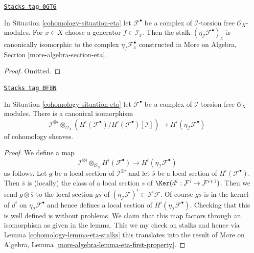 \begin{lemma}
\label{cohomology-lemma-eta-stalks}
\href{https://stacks.math.columbia.edu/tag/0GT6}{\texttt{Stacks tag 0GT6}}

In Situation \ref{cohomology-situation-eta}
let $\mathcal{F}^\bullet$ be a complex of $\mathcal{I}$-torsion free
$\mathcal{O}_X$-modules.
For $x \in X$ choose a generator $f \in \mathcal{I}_x$. Then
the stalk $(\eta_\mathcal{I}\mathcal{F}^\bullet)_x$ is canonically
isomorphic to the complex $\eta_f\mathcal{F}^\bullet_x$ constructed
in More on Algebra, Section \ref{more-algebra-section-eta}.
\end{lemma}

\begin{proof}
Omitted.
\end{proof}

\begin{lemma}
\label{cohomology-lemma-eta-first-property}
\href{https://stacks.math.columbia.edu/tag/0F8N}{\texttt{Stacks tag 0F8N}}

In Situation \ref{cohomology-situation-eta}
let $\mathcal{F}^\bullet$ be a complex of $\mathcal{I}$-torsion free
$\mathcal{O}_X$-modules. There is a canonical isomorphism
$$
\mathcal{I}^{\otimes i} \otimes_{\mathcal{O}_X}
\left(
H^i(\mathcal{F}^\bullet)/H^i(\mathcal{F}^\bullet)[\mathcal{I}]
\right)
\longrightarrow H^i(\eta_\mathcal{I}\mathcal{F}^\bullet)
$$
of cohomology sheaves.
\end{lemma}

\begin{proof}

We define a map
$$
\mathcal{I}^{\otimes i} \otimes_{\mathcal{O}_X} H^i(\mathcal{F}^\bullet)
\longrightarrow
H^i(\eta_\mathcal{I}\mathcal{F}^\bullet)
$$
as follows. Let $g$ be a local section of $\mathcal{I}^{\otimes i}$
and let $\overline{s}$ be a local section of $H^i(\mathcal{F}^\bullet)$.
Then $\overline{s}$ is (locally) the class of a local section $s$ of
$\Ker(d^i : \mathcal{F}^i \to \mathcal{F}^{i + 1})$.
Then we send $g \otimes \overline{s}$ to the local section
$gs$ of $(\eta_\mathcal{I}\mathcal{F})^i \subset \mathcal{I}^i\mathcal{F}$.
Of course $gs$ is in the kernel of $d^i$ on
$\eta_\mathcal{I}\mathcal{F}^\bullet$ and hence defines a local
section of $H^i(\eta_\mathcal{I}\mathcal{F}^\bullet)$.
Checking that this is well defined is without problems.
We claim that this map factors through an isomorphism
as given in the lemma. This we my check on stalks and hence
via Lemma \ref{cohomology-lemma-eta-stalks} this translates into the result of
More on Algebra, Lemma \ref{more-algebra-lemma-eta-first-property}.
\end{proof}

